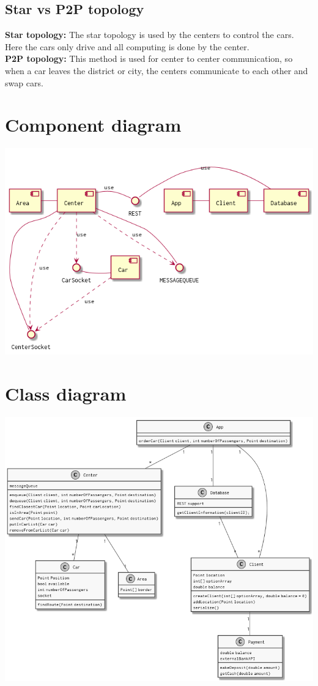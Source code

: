 \documentclass[a4paper]{article}
\begin{document}
\subsection*{Star vs P2P topology}
\textbf{Star topology:} The star topology is used by the centers to control the cars. Here the cars only drive and all computing is done by the center.\\
\textbf{P2P topology:} This method is used for center to center communication, so when a car leaves the district or city, the centers communicate to each other and swap cars.

\section*{Component diagram}
\includegraphics[width=1\textwidth]{../Diagrams/componentDiagram.png}

\section*{Class diagram}
\includegraphics[width=1\textwidth]{../Diagrams/classDiagram.png}
\end{document}
